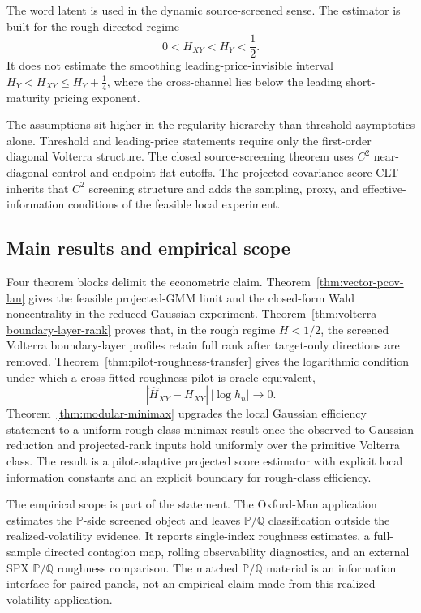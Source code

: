 \documentclass[11pt,a4paper]{amsart}
\theoremstyle{plain}
\theoremstyle{definition}
\theoremstyle{remark}
\newcommand{\PP}{\mathbb{P}}
\newcommand{\QQ}{\mathbb{Q}}
\begin{document}
The word latent is used in the dynamic source-screened sense.  The estimator is built for the rough
directed regime
\[
        0<H_{XY}<H_Y<\frac12.
\]
It does not estimate the smoothing leading-price-invisible interval
\(H_Y<H_{XY}\le H_Y+\tfrac14\), where the cross-channel lies below the leading short-maturity
pricing exponent.

The assumptions sit higher in the regularity hierarchy than threshold asymptotics alone.  Threshold
and leading-price statements require only the first-order diagonal Volterra structure.  The closed
source-screening theorem uses \(C^2\) near-diagonal control and endpoint-flat cutoffs.  The
projected covariance-score CLT inherits that \(C^2\) screening structure and adds the sampling,
proxy, and effective-information conditions of the feasible local experiment.

\subsection*{Main results and empirical scope}

Four theorem blocks delimit the econometric claim.  Theorem~\ref{thm:vector-pcov-lan} gives the
feasible projected-GMM limit and the closed-form Wald noncentrality in the reduced Gaussian
experiment.  Theorem~\ref{thm:volterra-boundary-layer-rank} proves that, in the rough regime
\(H<1/2\), the screened Volterra boundary-layer profiles retain full rank after target-only
directions are removed.  Theorem~\ref{thm:pilot-roughness-transfer} gives the logarithmic condition
under which a cross-fitted roughness pilot is oracle-equivalent,
\[
        |\widehat H_{XY}-H_{XY}|\,|\log h_n|\to0.
\]
Theorem~\ref{thm:modular-minimax} upgrades the local Gaussian efficiency statement to a uniform
rough-class minimax result once the observed-to-Gaussian reduction and projected-rank inputs hold
uniformly over the primitive Volterra class.  The result is a pilot-adaptive projected score
estimator with explicit local information constants and an explicit boundary for rough-class
efficiency.

The empirical scope is part of the statement.  The Oxford-Man application estimates the
\(\PP\)-side screened object and leaves \(\PP/\QQ\) classification outside the
realized-volatility evidence.  It reports single-index roughness estimates, a full-sample directed
contagion map, rolling observability diagnostics, and an external SPX \(\PP/\QQ\) roughness
comparison.  The matched
\(\PP/\QQ\) material is an information interface for paired panels, not an empirical claim made from
this realized-volatility application.
\end{document}
